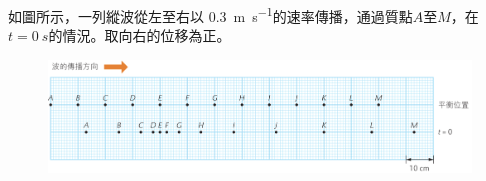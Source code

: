 {
    如圖所示，一列縱波從左至右以 \qty{0.3}{m.s^{-1}}的速率傳播，通過質點$A$至$M$，在$t=\qty{0}{s}$的情況。取向右的位移為正。
    \begin{figure}[h!]
        \centering
        \includegraphics[width=\textwidth]{assets/da6d903d.png}
    \end{figure}
    }
